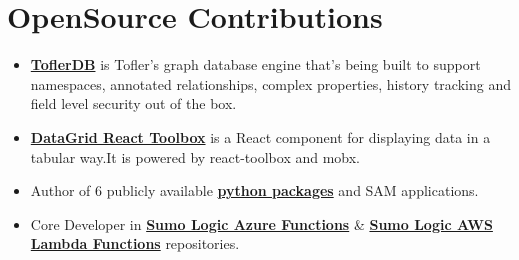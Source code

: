 \documentclass[margin,line]{resume}
\begin{document}
\begin{resume}
\begin{itemize}
    \end{itemize}



\section{\mysidestyle OpenSource Contributions}
\vspace{0mm}
    \begin{itemize}
                \item \href{https://github.com/tofler/toflerdb}{\textbf{ToflerDB}} is Tofler's graph database engine that's being built to support namespaces, annotated relationships, complex properties, history tracking and field level security out of the box.
                \item \href{https://github.com/tofler/datagrid-react-toolbox}{\textbf{DataGrid React Toolbox}} is a React component for displaying data in a tabular way.It is powered by react-toolbox and mobx.
                \item
                Author of 6 publicly available \href{https://pypi.org/user/himanshu_pal/}{\textbf{python packages}} and SAM applications.
                \item 
                Core Developer in \href{https://github.com/SumoLogic/sumologic-azure-function}{\textbf{Sumo Logic Azure Functions}} \& \href{https://github.com/SumoLogic/sumologic-aws-lambda}{\textbf{Sumo Logic AWS Lambda Functions}} repositories.

    \end{itemize}


\end{resume}
\end{document}
